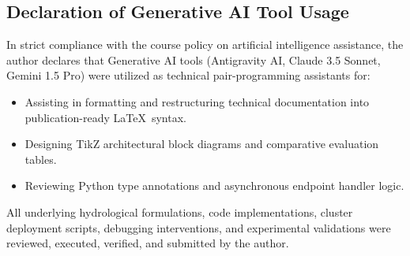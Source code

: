 \documentclass[11pt,a4paper]{article}
\begin{document}
\subsection{Declaration of Generative AI Tool Usage}
In strict compliance with the course policy on artificial intelligence assistance, the author declares that Generative AI tools (Antigravity AI, Claude 3.5 Sonnet, Gemini 1.5 Pro) were utilized as technical pair-programming assistants for:
\begin{itemize}[noitemsep,topsep=2pt]
    \item Assisting in formatting and restructuring technical documentation into publication-ready \LaTeX\ syntax.
    \item Designing TikZ architectural block diagrams and comparative evaluation tables.
    \item Reviewing Python type annotations and asynchronous endpoint handler logic.
\end{itemize}
All underlying hydrological formulations, code implementations, cluster deployment scripts, debugging interventions, and experimental validations were reviewed, executed, verified, and submitted by the author.
\end{document}
